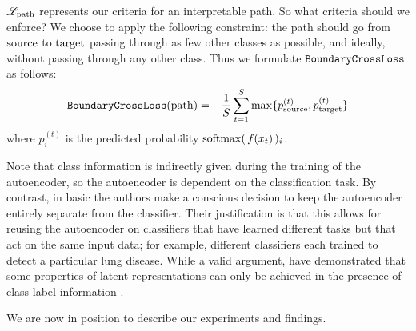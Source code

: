 \documentclass[../main.tex]{subfiles}
\begin{document}
$\mathscr{L}_\text{path}$ represents our criteria for an interpretable path. So what criteria should we enforce?
We choose to apply the following constraint: the path should go from $\mathrm{source}$ to $\mathrm{target}$ passing through as few other classes as possible, and ideally, without passing through any other class.
Thus we formulate $\mathtt{BoundaryCrossLoss}$ as follows:
\begin{align*}
\mathtt{BoundaryCrossLoss}(\mathrm{path}) = -
\frac{1}{S} \sum_{t=1}^{S}
\max \{ p^{(t)}_{\mathrm{source}}, p^{(t)}_{\mathrm{target}} \}
\end{align*}
where $p^{(t)}_i$ is the predicted probability $\mathrm{softmax}(\,f(x_t)\,)_i$.

Note that class information is indirectly given during the training of the autoencoder, so the autoencoder is dependent on the classification task.
By contrast, in basic \ls{} the authors make a conscious decision to keep the autoencoder entirely separate from the classifier.
Their justification is that this allows for reusing the autoencoder on classifiers that have learned different tasks but that act on the same input data; for example, different classifiers each trained to detect a particular lung disease.
While a valid argument, \citeauthor{locatelloChallenging2019} have demonstrated that some properties of latent representations can only be achieved in the presence of class label information \cite{locatelloChallenging2019}.

We are now in position to describe our experiments and findings.
\end{document}
